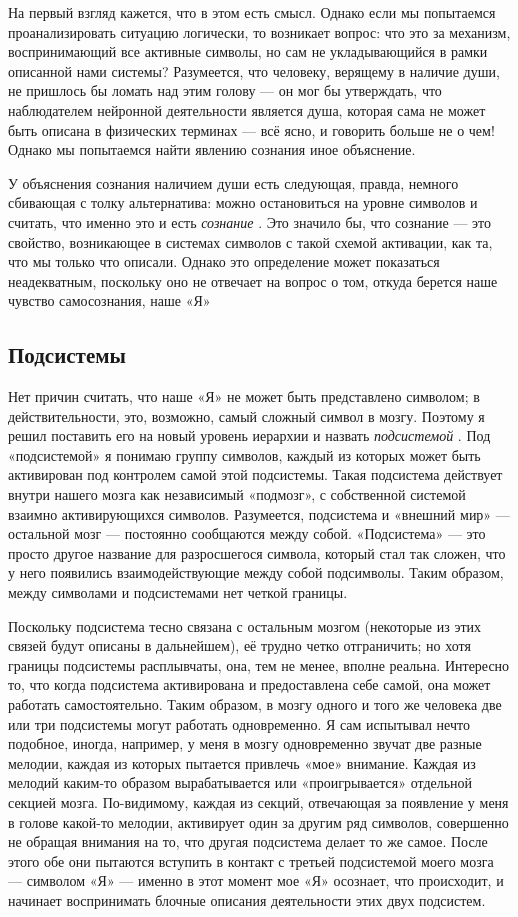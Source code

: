 \documentclass[../main.tex]{subfiles}
\begin{document}
На первый взгляд кажется, что в этом есть смысл. Однако если мы попытаемся проанализировать ситуацию логически, то возникает вопрос: что это за механизм, воспринимающий все активные символы, но сам не укладывающийся в рамки описанной нами системы? Разумеется, что человеку, верящему в наличие души, не пришлось бы ломать над этим голову --- он мог бы утверждать, что наблюдателем нейронной деятельности является душа, которая сама не может быть описана в физических терминах --- всё ясно, и говорить больше не о чем! Однако мы попытаемся найти явлению сознания иное объяснение.

У объяснения сознания наличием души есть следующая, правда, немного сбивающая с толку альтернатива: можно остановиться на уровне символов и считать, что именно это и есть \emph{сознание} . Это значило бы, что сознание --- это свойство, возникающее в системах символов с такой схемой активации, как та, что мы только что описали. Однако это определение может показаться неадекватным, поскольку оно не отвечает на вопрос о том, откуда берется наше чувство самосознания, наше «Я»


\subsection{Подсистемы}

Нет причин считать, что наше «Я» не может быть представлено символом; в действительности, это, возможно, самый сложный символ в мозгу. Поэтому я решил поставить его на новый уровень иерархии и назвать \emph{подсистемой} . Под «подсистемой» я понимаю группу символов, каждый из которых может быть активирован под контролем самой этой подсистемы. Такая подсистема действует внутри нашего мозга как независимый «подмозг», с собственной системой взаимно активирующихся символов. Разумеется, подсистема и «внешний мир» --- остальной мозг --- постоянно сообщаются между собой. «Подсистема» --- это просто другое название для разросшегося символа, который стал так сложен, что у него появились взаимодействующие между собой подсимволы. Таким образом, между символами и подсистемами нет четкой границы.

Поскольку подсистема тесно связана с остальным мозгом (некоторые из этих связей будут описаны в дальнейшем), её трудно четко отграничить; но хотя границы подсистемы расплывчаты, она, тем не менее, вполне реальна. Интересно то, что когда подсистема активирована и предоставлена себе самой, она может работать самостоятельно. Таким образом, в мозгу одного и того же человека две или три подсистемы могут работать одновременно. Я сам испытывал нечто подобное, иногда, например, у меня в мозгу одновременно звучат две разные мелодии, каждая из которых пытается привлечь «мое» внимание. Каждая из мелодий каким-то образом вырабатывается или «проигрывается» отдельной секцией мозга. По-видимому, каждая из секций, отвечающая за появление у меня в голове какой-то мелодии, активирует один за другим ряд символов, совершенно не обращая внимания на то, что другая подсистема делает то же самое. После этого обе они пытаются вступить в контакт с третьей подсистемой моего мозга --- символом «Я» --- именно в этот момент мое «Я» осознает, что происходит, и начинает воспринимать блочные описания деятельности этих двух подсистем.
\end{document}
